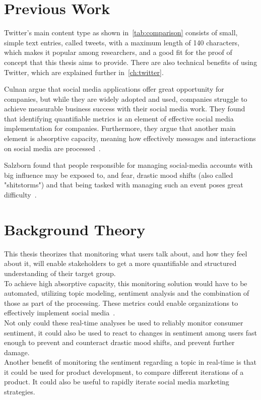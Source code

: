 \section{Previous Work}
\label{sec:previousWork}

Twitter's main content type as shown in~\cref{tab:comparison} consists of small, simple text entries, called tweets, with a maximum length of 140 characters,
which makes it popular among researchers, and a good fit for the proof of concept that this thesis aims to provide.
There are also technical benefits of using Twitter, which are explained further in~\cref{ch:twitter}.

Culnan \etAl argue that social media applications offer great opportunity for companies,
but while they are widely adopted and used,
companies struggle to achieve measurable business success with their social media work.
They found that identifying quantifiable metrics is an element of effective social media implementation for companies.
Furthermore, they argue that another main element is absorptive capacity, meaning how effectively messages and
interactions on social media are processed~\cite{Culnan2015}.

Salzborn \etAl found that people responsible for managing social-media accounts with big influence may be exposed to, and fear,
drastic mood shifts (also called "shitstorms") and that being tasked with managing such an event poses great difficulty~\cite{Salzborn2015}.

\section{Background Theory}
\label{sec:backgroundTheory}

This thesis theorizes that monitoring what users talk about,
and how they feel about it, will enable stakeholders to get a more quantifiable and structured understanding of their target group.\\
To achieve high absorptive capacity, this monitoring solution would have to be automated,
utilizing topic modeling, sentiment analysis and the combination of those as part of the processing.
These metrics could enable organizations to effectively implement social media~\cite{Culnan2015}.\\
Not only could these real-time analyses be used to reliably monitor consumer sentiment,
it could also be used to react to changes in sentiment among users fast enough to prevent and counteract
drastic mood shifts, and prevent further damage.\\
Another benefit of monitoring the sentiment regarding a topic in real-time is that it could be used for product development,
to compare different iterations of a product.
It could also be useful to rapidly iterate social media marketing strategies.